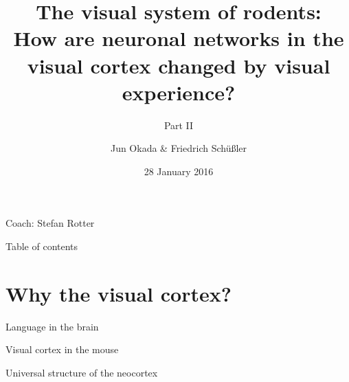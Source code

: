 \documentclass[xcolor=x11names,compress]{beamer}
\renewcommand{\(}{\begin{columns}}
\renewcommand{\)}{\end{columns}}
\newcommand{\<}[1]{\begin{column}{#1}}
\renewcommand{\>}{\end{column}}
\begin{document}
\begin{frame}{}
\title[FM]{The  visual  system  of  rodents: \\
How are neuronal    networks    in  the visual cortex  changed by  visual  experience?}
\subtitle{Part II}
\author{
Jun Okada \& Friedrich Schüßler}
\date{\normalsize 28 January 2016}
\titlepage

\centering 
Coach: Stefan Rotter
\end{frame}

\begin{frame}{Table of contents}
    \tableofcontents
\end{frame}


\section{Why the visual cortex?}
\label{sec:why_the_visual_cortex_}

\begin{frame}[t]{Language in the brain}
\begin{center}
\end{center}
\end{frame}

\begin{frame}[t]{Visual cortex in the mouse}
\end{frame}

\begin{frame}[t]{Universal structure of the neocortex}
\end{frame}
\end{document}
